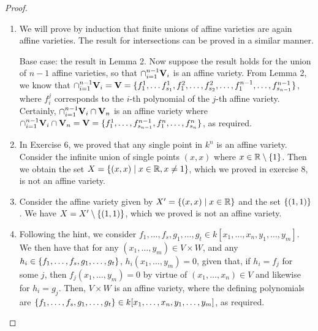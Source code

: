 \begin{proof}
    \begin{enumerate}
        \item We will prove by induction that finite unions of affine varieties are again affine varieties. The result for intersections can be proved in a similar manner. 

        Base case: the result in Lemma 2. Now suppose the result holds for the union of $n-1$ affine varieties, so that $\cap_{i=1}^{n-1}\mathbf{V}_i$ is an affine variety. From Lemma 2, we know that $\cap_{i=1}^{n-1}\mathbf{V}_i= \\\mathbf{V}= {\{f_1^1,\dots f_{s_1}^1,f_1^2,\dots,f_{s_2}^2,\dots,f_1^{n-1},\dots,f_{s_{n-1}}^{n-1}\}}$, where $f_i^j$ corresponds to the $i$-th polynomial of the $j$-th affine variety. Certainly, $\cap_{i=1}^{n-1}\mathbf{V}_i\cap \mathbf{V}_n$ is an affine variety where $\cap_{i=1}^{n-1}\mathbf{V}_i\cap \mathbf{V}_n= \mathbf{V}=\{f_1^1,\dots,f_{s_{n-1}}^{n-1},f_1^n,\dots,f_{s_n}^n\}$, as required.
        \item In Exercise 6, we proved that any single point in $k^n$ is an affine variety. Consider the infinite union of single points $(x,x)$ where $x\in\mathbb{R}\setminus\{1\}$. Then we obtain the set $X=\{(x,x)\mid x\in\mathbb{R},x\neq 1\}$, which we proved in exercise 8, is not an affine variety.
        \item Consider the affine variety given by $X'=\{(x,x)\mid x\in\mathbb{R}\}$ and the set $\{(1,1)\}$. We have $X=X'\setminus\{(1,1)\}$, which we proved is not an affine variety.
        \item Following the hint, we consider $f_1,\dots,f_s,g_1,\dots,g_t\in k[x_1,\dots,x_n,y_1,\dots,y_m]$. We then have that for any $(x_1,\dots,y_m)\in V\times W$, and any $h_i\in\\ \{f_1,\dots,f_s,g_1,\dots,g_t\}$, $h_i(x_1,\dots,y_m)=0$, given that, if $h_i=f_j$ for some $j$, then $f_j(x_1,\dots,y_m)=0$ by virtue of $(x_1,\dots,x_n)\in V$ and likewise for $h_i=g_j$. Then, $V\times W$ is an affine variety, where the defining polynomials are $\{f_1,\dots,f_s,g_1,\dots,g_t\}\in k[x_1,\dots,x_n,y_1,\dots,y_m]$, as required.
    \end{enumerate}
\end{proof}
